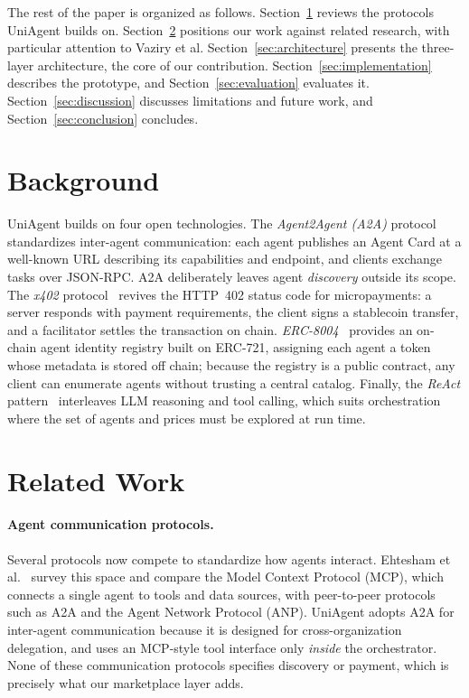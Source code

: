 \documentclass[sigconf]{acmart}
\begin{document}
The rest of the paper is organized as follows.
Section~\ref{sec:background} reviews the protocols UniAgent builds on.
Section~\ref{sec:related} positions our work against related research,
with particular attention to Vaziry et al.
Section~\ref{sec:architecture} presents the three-layer architecture,
the core of our contribution. Section~\ref{sec:implementation}
describes the prototype, and Section~\ref{sec:evaluation} evaluates it.
Section~\ref{sec:discussion} discusses limitations and future work, and
Section~\ref{sec:conclusion} concludes.

\section{Background}
\label{sec:background}

UniAgent builds on four open technologies.
The \emph{Agent2Agent (A2A)} protocol~\cite{a2a2025} standardizes
inter-agent communication: each agent publishes an Agent Card at a
well-known URL describing its capabilities and endpoint, and clients
exchange tasks over JSON-RPC. A2A deliberately leaves agent
\emph{discovery} outside its scope.
The \emph{x402} protocol~\cite{x402whitepaper} revives the HTTP~402
status code for micropayments: a server responds with payment
requirements, the client signs a stablecoin transfer, and a facilitator
settles the transaction on chain.
\emph{ERC-8004}~\cite{erc8004} provides an on-chain agent identity
registry built on ERC-721, assigning each agent a token whose metadata
is stored off chain; because the registry is a public contract, any
client can enumerate agents without trusting a central catalog.
Finally, the \emph{ReAct} pattern~\cite{yao2023react} interleaves LLM
reasoning and tool calling, which suits orchestration where the set of
agents and prices must be explored at run time.

\section{Related Work}
\label{sec:related}

\paragraph{Agent communication protocols.}
Several protocols now compete to standardize how agents interact.
Ehtesham et al.~\cite{ehtesham2025survey} survey this space and compare
the Model Context Protocol (MCP), which connects a single
agent to tools and data sources, with peer-to-peer protocols such as
A2A and the Agent Network Protocol (ANP). UniAgent adopts A2A for
inter-agent communication because it is designed for cross-organization
delegation, and uses an MCP-style tool interface only \emph{inside} the
orchestrator. None of these communication protocols specifies discovery
or payment, which is precisely what our marketplace layer adds.
\end{document}
